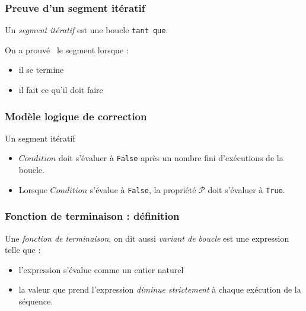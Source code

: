 



\begin{frame}
  \frametitle{Preuve d'un segment itératif}
Un \emph{segment itératif} est une boucle \texttt{tant que}.

On a \og prouvé\fg~ le segment lorsque :
\begin{itemize}
  \item il se termine
  \item il fait ce qu'il doit faire
\end{itemize}
\end{frame}

\begin{frame}
  \frametitle{Modèle logique de correction}
\begin{algorithm}[H]
  \caption{Un segment itératif}
  \label{corsegit_1}
\end{algorithm}
\begin{itemize}
  \item $Condition$ doit s'évaluer à \texttt{False} après un nombre fini d'exécutions de la boucle.
  \item Lorsque $Condition$ s'évalue à \texttt{False}, la propriété $\mathcal{P}$ doit s'évaluer à \texttt{True}.
\end{itemize}
\end{frame}

\begin{frame}
  \frametitle{Fonction de terminaison : définition}
\begin{defi}
Une \emph{fonction de terminaison}, on dit aussi \emph{variant de boucle} est une expression telle que :
\begin{itemize}                                                                                                                                                                                                                                               \item l'expression s'évalue comme un entier naturel
\item la valeur que prend l'expression \emph{diminue strictement} à chaque exécution de la séquence.                                                                                                                                                                                                                             \end{itemize}
\end{defi}
\end{frame}

